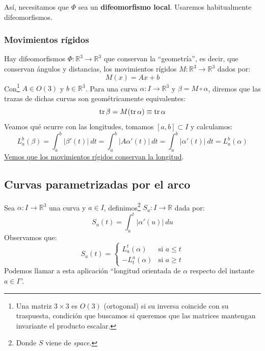 \noindent
Así, necesitamos que $\Phi$ sea un \textbf{difeomorfismo local}. Usaremos habitualmente difeomorfismos.

\subsubsection{Movimientos rígidos}
\noindent
Hay difeomorfismos $\Phi:\mathbb{R}^3\to \mathbb{R}^3$ que conservan la ``geometría'', es decir, que conservan ángulos y distancias, los movimientos rígidos $M:\mathbb{R}^3\to\mathbb{R}^3$ dados por:
\begin{equation*}
    M(x) = Ax + b 
\end{equation*}
Con\footnote{Una matriz $3\times 3$ es $O(3)$ (ortogonal) si su inversa coincide con su traspuesta, condición que buscamos si queremos que las matrices mantengan invariante el producto escalar.} $A\in O(3)$ y $b\in \mathbb{R}^3$. Para una curva $\alpha:I\to\mathbb{R}^3$ y $\beta = M\circ \alpha$, diremos que las trazas de dichas curvas son geométricamente equivalentes:
\begin{equation*}
    \operatorname{tr}\beta = M(\operatorname{tr} \alpha)\equiv \operatorname{tr}\alpha
\end{equation*}
Veamos qué ocurre con las longitudes, tomamos $[a,b]\subset I$ y calculamos:
\begin{equation*}
    L_a^b(\beta) = \int_{a}^{b} |\beta'(t)|~dt  = \int_{a}^{b} |A\alpha'(t)|~dt  = \int_{a}^{b} |\alpha'(t)|~dt  = L_a^b(\alpha)
\end{equation*}
\underline{Vemos que los movimientos rígidos conservan la longitud}.\\

\subsection{Curvas parametrizadas por el arco}
\begin{definicion}
    Sea $\alpha:I\to \mathbb{R}^3$ una curva y $a\in I$, definimos\footnote{Donde $S$ viene de \textit{space}.} $S_a:I\to \mathbb{R}$ dada por:
    \begin{equation*}
        S_a(t) = \int_{a}^{t} |\alpha'(u)|~du 
    \end{equation*}
    Observamos que:
    \begin{equation*}
        S_a(t) = \left\{\begin{array}{rl}
            L_a^t(\alpha) & \text{si\ } a\leq t \\
            -L_t^a(\alpha) & \text{si\ } a \geq t
        \end{array}\right. 
    \end{equation*}
    Podemos llamar a esta aplicación ``longitud orientada de $\alpha$ respecto del instante $a\in I$''.
\end{definicion}

